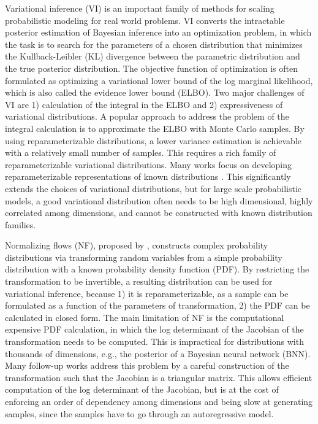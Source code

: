 \documentclass[twoside]{article}
\begin{document}
Variational inference (VI) is an important family of methods for scaling probabilistic modeling for real world problems. VI converts the intractable posterior estimation of Bayesian inference into an optimization problem, in which the task is to search for the parameters of a chosen distribution that minimizes the Kullback-Leibler (KL) divergence between the parametric distribution and the true posterior distribution. The objective function of optimization is often formulated as optimizing a variational lower bound of the log marginal likelihood, which is also called the evidence lower bound (ELBO). Two major challenges of VI are 1) calculation of the integral in the ELBO and 2) expressiveness of variational distributions. 
A popular approach to address the problem of the integral calculation is to approximate the ELBO with Monte Carlo samples. By using reparameterizable distributions, a lower variance estimation is achievable with a relatively small number of samples. This requires a rich family of reparameterizable variational distributions. Many works focus on developing reparameterizable representations of known distributions \citep{RuizEtAl2016,NaessethEtAl2016,FigurnovEtAl2018}. This significantly extends the choices of variational distributions, but for large scale probabilistic models, a good variational distribution often needs to be  high dimensional, highly correlated among dimensions, and cannot be constructed with known distribution families. 

Normalizing flows (NF), proposed by \cite{JimenezRezendeMohamed2015}, constructs complex probability distributions via transforming random variables from a simple probability distribution with a known probability density function (PDF). By restricting the transformation to be invertible, a resulting distribution can be used for variational inference, because 1) it is reparameterizable, as a sample can be formulated as a function of the parameters of transformation, 2) the PDF can be calculated in closed form. The main limitation of NF is the computational expensive PDF calculation, in which the log determinant of the Jacobian of the transformation needs to be computed. This is impractical for distributions with thousands of dimensions, e.g., the posterior of a  Bayesian neural network (BNN). Many follow-up works \citep{KingmaEtAl2016, DinhEtAl2017, HuangEtAl2018} address this problem by a careful construction of the transformation such that the Jacobian is a triangular matrix. This allows efficient computation of the log determinant of the Jacobian, but is at the cost of enforcing an order of dependency among dimensions and being slow at generating samples, since the samples have to go through an autoregressive model.
\end{document}
